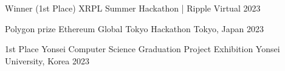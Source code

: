 




\begin{cvhonors}


\cvhonor
{Winner (1st Place)} %
{XRPL Summer Hackathon | Ripple} %
{Virtual} %
{2023} %

\cvhonor
{Polygon prize} %
{Ethereum Global Tokyo Hackathon} %
{Tokyo, Japan} %
{2023} %


\end{cvhonors}




\begin{cvhonors}


\cvhonor
{1st Place} %
{Yonsei Computer Science Graduation Project Exhibition} %
{Yonsei University, Korea} %
{2023} %


\end{cvhonors}
